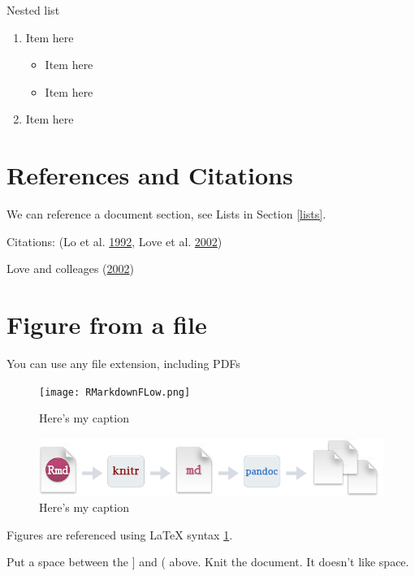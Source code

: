 \documentclass[12pt,]{article}
\begin{document}
Nested list

\begin{enumerate}[itemsep=3pt,nolistsep,topsep=12pt]
\item Item here
   \begin{itemize}[itemsep=6pt,nolistsep,topsep=0pt]
   \item Item here
   \item Item here
   \end{itemize}
\item Item here
\end{enumerate}

\section{References and Citations}\label{references-and-citations}

We can reference a document section, see Lists in Section \ref{lists}.

Citations: (Lo et al. \protect\hyperlink{ref-Lo1992}{1992}, Love et al.
\protect\hyperlink{ref-Love2002}{2002})

Love and colleages (\protect\hyperlink{ref-Love2002}{2002})

\section{Figure from a file}\label{figure-from-a-file}

You can use any file extension, including PDFs

\begin{figure}[htbp]
\centering
\texttt{[image: RMarkdownFLow.png]}
\caption{Here's my caption \label{fig:fig_example}}
\end{figure}

\begin{figure}[htbp]
\centering
\includegraphics{./Figures/RMarkdownFLow1.png}
\caption{Here's my caption \label{fig:fig_example2}}
\end{figure}

Figures are referenced using LaTeX syntax \ref{fig:fig_example}.

Put a space between the {]} and ( above. Knit the document. It doesn't
like space.
\end{document}
